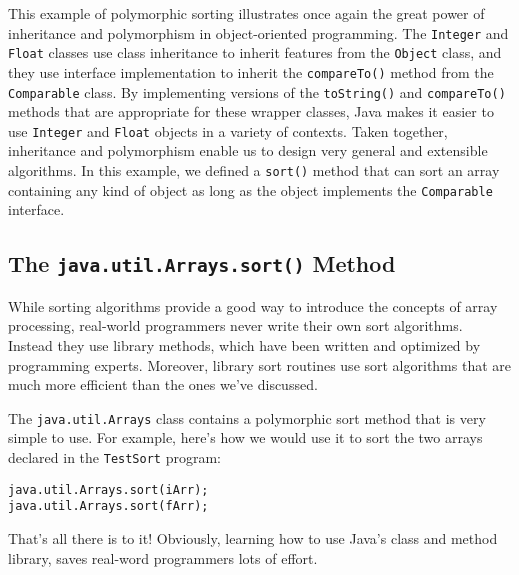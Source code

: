 This example of polymorphic sorting illustrates once again the great
power of inheritance and polymorphism in object-oriented programming.
The {\tt Integer} and {\tt Float} classes use class inheritance to
inherit features from the {\tt Object} class, and they use interface
implementation to inherit the {\tt compareTo()} method from the {\tt
Comparable} class.  By implementing versions of the {\tt toString()}
and {\tt compareTo()} methods that are appropriate for these wrapper
classes, Java makes it easier to use {\tt Integer} and {\tt Float}
objects in a variety of contexts.  Taken together, inheritance and
polymorphism enable us to design very general and extensible
algorithms.  In this example, we defined a {\tt sort()} method that
can sort an array containing any kind of object as long as the object
implements the {\tt Comparable} interface. 

\subsection{The {\tt java.util.Arrays.sort()} Method}

\noindent While sorting algorithms provide a good way to introduce the
concepts of array processing, real-world programmers never write their
own sort algorithms. Instead they use library methods, which have been
written and optimized by programming experts. Moreover, library sort
routines use sort algorithms that are much more efficient than the
ones we've discussed.

The {\tt java.util.Arrays} class contains a polymorphic sort
method that is very simple to use. For example, here's how we
would use it to sort the two arrays declared in the {\tt TestSort}
program:

\begin{jjjlisting}
\begin{lstlisting}
java.util.Arrays.sort(iArr);
java.util.Arrays.sort(fArr);
\end{lstlisting}
\end{jjjlisting}

\noindent That's all there is to it! Obviously, learning how to use
Java's class and method library, saves real-word programmers lots of
effort.


